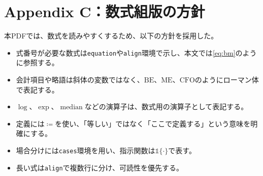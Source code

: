 \documentclass[11pt,a4paper]{article}
\newcommand{\BE}{\mathrm{BE}}
\newcommand{\ME}{\mathrm{ME}}
\newcommand{\CFO}{\mathrm{CFO}}
\newcommand{\ind}{\mathbb{1}}
\begin{document}
\clearpage
\section{Appendix C：数式組版の方針}

本PDFでは、数式を読みやすくするため、以下の方針を採用した。

\begin{itemize}[leftmargin=1.7em]
\item 式番号が必要な数式は\texttt{equation}や\texttt{align}環境で示し、本文では\eqref{eq:bm}のように参照する。
\item 会計項目や略語は斜体の変数ではなく、$\BE$、$\ME$、$\CFO$のようにローマン体で表記する。
\item $\log$、$\exp$、$\operatorname{median}$などの演算子は、数式用の演算子として表記する。
\item 定義には$\coloneqq$を使い、「等しい」ではなく「ここで定義する」という意味を明確にする。
\item 場合分けには\texttt{cases}環境を用い、指示関数は$\ind\{\cdot\}$で表す。
\item 長い式は\texttt{align}で複数行に分け、可読性を優先する。
\end{itemize}
\end{document}
